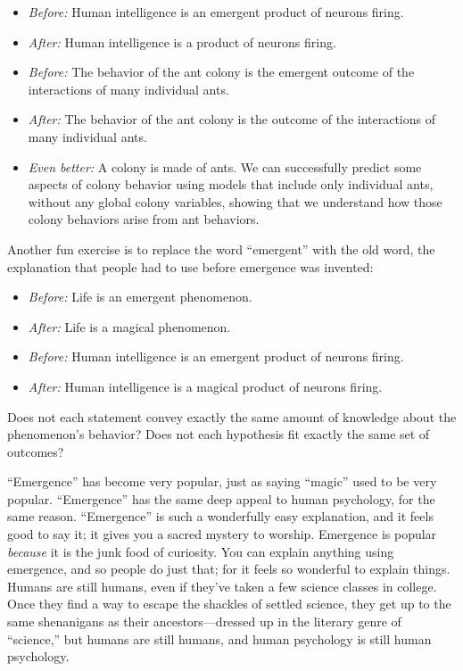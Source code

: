\begin{itemize}
\item {
 \textit{Before:} Human intelligence is an emergent product of
neurons firing.}

\item {
 \textit{After:} Human intelligence is a product of neurons
firing.}

\item {
 \textit{Before:} The behavior of the ant colony is the emergent
outcome of the interactions of many individual ants.}

\item {
 \textit{After:} The behavior of the ant colony is the outcome of
the interactions of many individual ants.}

\item {
 \textit{Even better:} A colony is made of ants. We can
successfully predict some aspects of colony behavior using models that
include only individual ants, without any global colony variables,
showing that we understand how those colony behaviors arise from ant
behaviors.}
\end{itemize}

{
 Another fun exercise is to replace the word
``emergent'' with the old word, the
explanation that people had to use before emergence was invented:}

\begin{itemize}
\item {
 \textit{Before:} Life is an emergent phenomenon.}

\item {
 \textit{After:} Life is a magical phenomenon.}

\item {
 \textit{Before:} Human intelligence is an emergent product of
neurons firing.}

\item {
 \textit{After:} Human intelligence is a magical product of neurons
 firing.}
\end{itemize}

{
 Does not each statement convey exactly the same amount of
knowledge about the phenomenon's behavior? Does not
each hypothesis fit exactly the same set of outcomes?}

{
 ``Emergence'' has become very
popular, just as saying ``magic''
used to be very popular.
``Emergence'' has the same deep
appeal to human psychology, for the same reason.
``Emergence'' is such a wonderfully
easy explanation, and it feels good to say it; it gives you a sacred
mystery to worship. Emergence is popular \textit{because} it is the
junk food of curiosity. You can explain anything using emergence, and
so people do just that; for it feels so wonderful to explain things.
Humans are still humans, even if they've taken a few
science classes in college. Once they find a way to escape the shackles
of settled science, they get up to the same shenanigans as their
ancestors---dressed up in the literary genre of
``science,'' but humans are still
humans, and human psychology is still human psychology.}

